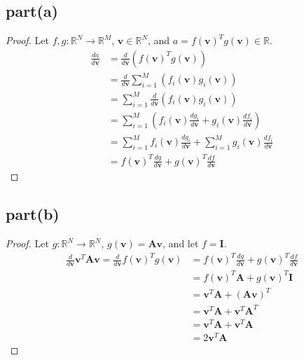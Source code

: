 \documentclass[12pt]{amsart}
\newcommand{\vect}[1]{\mathbf{#1}}
\begin{document}
\subsection*{part(a)}
\begin{proof}
Let $f,g:\mathbb{R}^N\to\mathbb{R}^M$,  $\vect{v}\in\mathbb{R}^N$, and $a = f(\vect{v})^T g(\vect{v})\in \mathbb{R}$.
\begin{align*}
    \frac{da}{d\vect{v}} &= \frac{d}{d\vect{v}}(f(\vect{v})^T g(\vect{v}))\\
    &= \frac{d}{d\vect{v}} \sum_{i=1}^M (f_i(\vect{v})g_i(\vect{v}))\\
    &= \sum_{i=1}^M \frac{d}{d\vect{v}}(f_i(\vect{v})g_i(\vect{v}))\\
    &= \sum_{i=1}^M (f_i(\vect{v})\frac{dg_i}{d\vect{v}}+g_i(\vect{v})\frac{df_i}{d\vect{v}})\\
    &= \sum_{i=1}^M f_i(\vect{v})\frac{dg_i}{d\vect{v}} +\sum_{i=1}^M g_i(\vect{v})\frac{df_i}{d\vect{v}}\\
    &= f(\vect{v})^T\frac{dg}{d\vect{v}} +g(\vect{v})^T\frac{df}{d\vect{v}}
\end{align*}
\end{proof}

\subsection*{part(b)}
\begin{proof}
Let $g:\mathbb{R}^N\to\mathbb{R}^N$, $g(\vect{v})=\vect{A}\vect{v}$, and let $f=\textbf{I}$.
\begin{align*}
    \frac{d}{d\vect{v}}\vect{v}^T\vect{A}\vect{v}
    = \frac{d}{d\vect{v}}f(\vect{v})^T g(\vect{v})
    &=f(\vect{v})^T \frac{dg}{d\vect{v}}
    + g(\vect{v})^T  \frac{df}{d\vect{v}}\\
    &= f(\vect{v})^T \vect{A}
    +g(\vect{v})^T\vect{I}\\
&= \vect{v}^T\vect{A}+(\vect{A}\vect{v})^T\\
&= \vect{v}^T\vect{A} + \vect{v}^T\vect{A}^T\\
&= \vect{v}^T\vect{A} + \vect{v}^T\vect{A}\\
&= 2\vect{v}^T\vect{A}
\end{align*}
\end{proof}
\end{document}
